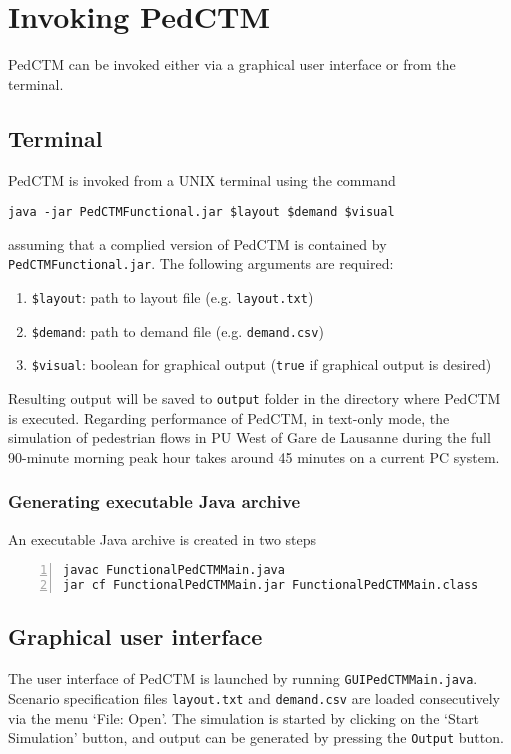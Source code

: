 \documentclass[a4paper,12pt]{article}
\begin{document}
\section{Invoking PedCTM}
PedCTM can be invoked either via a graphical user interface or from the terminal.

\subsection{Terminal}
PedCTM is invoked from a UNIX terminal using the command
\begin{Verbatim}
java -jar PedCTMFunctional.jar $layout $demand $visual
\end{Verbatim}
assuming that a complied version of PedCTM is contained by \verb+PedCTMFunctional.jar+. The following arguments are required: 

\begin{enumerate}
\item \verb+$layout+: path to layout file (e.g. \verb+layout.txt+)
\item \verb+$demand+:  path to demand file  (e.g. \verb+demand.csv+)
\item \verb+$visual+: boolean for graphical output (\verb+true+ if graphical output is desired)
\end{enumerate}
Resulting output will be saved to \verb+output+ folder in the directory where PedCTM is executed. Regarding performance of PedCTM, in text-only mode, the simulation of pedestrian flows in PU West of Gare de Lausanne during the full 90-minute morning peak hour takes around 45 minutes on a current PC system.

\subsubsection{Generating executable Java archive}
An executable Java archive is created in two steps
\begin{Verbatim}[numbers=left]
javac FunctionalPedCTMMain.java
jar cf FunctionalPedCTMMain.jar FunctionalPedCTMMain.class
\end{Verbatim}

\subsection{Graphical user interface}
The user interface of PedCTM is launched by running \verb+GUIPedCTMMain.java+. Scenario specification files \verb+layout.txt+ and \verb+demand.csv+ are loaded consecutively via the menu `File: Open'. The simulation is started by clicking on the `Start Simulation' button, and output can be generated by pressing the \verb+Output+ button.
\end{document}

